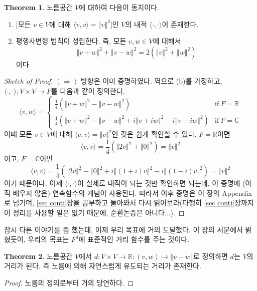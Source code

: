 \documentclass[11pt]{book}
\numberwithin{equation}{chapter}
\def\RR{\mathbb{R}}
\def\CC{\mathbb{C}}
\newcommand{\inner}[2]{\langle#1, #2\rangle}
\newcommand{\norm}[1]{\left\Vert#1\right\Vert}
\def\textif{\text{if}}
\theoremstyle{definition}
\newtheorem{thm}{Theorem}[section]
\begin{document}
\begin{thm} \label{thm 3.3.4}
    노름공간 \(V\)에 대하여 다음이 동치이다.
    \begin{enumerate} [label=(\alph*), leftmargin=2\parindent]
        \item {[모든 \(v \in V\)에 대해 \(\inner{v}{v} = \norm{v}^2\)]}인 \(V\)의 내적 \(\inner{\cdot}{\cdot}\)이 존재한다.
        \item 평행사변형 법칙이 성립한다. 즉, 모든 \(v, w \in V\)에 대해서
        \[
            \norm{v+w}^2 + \norm{v-w}^2 = 2(\norm{v}^2 + \norm{w}^2)    
        \]
        이다.
    \end{enumerate}
\end{thm}
\begin{proof} [Sketch of Proof]
    \((\Rightarrow)\) 방향은 이미 증명하였다. 역으로 (b)를 가정하고, \(\inner{\cdot}{\cdot} : V \times V \to F\)를 다음과 같이 정의한다.
    \[
    \inner{v}{w} =
        \begin{cases}
            \frac{1}{4}(\norm{v+w}^2 - \norm{v-w}^2) &\textif \ F = \RR\\
            \frac{1}{4}(\norm{v+w}^2 - \norm{v-w}^2 + i\norm{v+iw}^2 -i\norm{v-iw}^2) &\textif \ F = \CC
        \end{cases}    
    \]
    이때 모든 \(v \in V\)에 대해 \(\inner{v}{v} = \norm{v}^2\)인 것은 쉽게 확인할 수 있다. \(F = \RR\)이면
    \[
    \inner{v}{v} = \frac{1}{4}(\norm{2v}^2 + \norm{0}^2) = \norm{v}^2  
    \]
    이고, \(F =\CC\)이면
    \[
    \inner{v}{v} = \frac{1}{4}(\norm{2v}^2 - \norm{0}^2 + i\norm{(1+i)v}^2 -i\norm{(1-i)v}^2) = \norm{v}^2    
    \]
    이기 때문이다. 이제 \(\inner{\cdot}{\cdot}\)이 실제로 내적이 되는 것만 확인하면 되는데, 이 증명에 (아직 배우지 않은) 연속함수의 개념이 사용된다. 따라서 이후 증명은 이 장의 Appendix로 넘기며, \ref{sec conti}장을 공부하고 돌아와서 다시 읽어보라(다행히 \ref{sec conti}장까지 이 정리를 사용할 일은 없기 때문에, 순환논증은 아니다\(\ldots\)).
\end{proof}

잠시 다른 이야기를 좀 했는데, 이제 우리 목표에 거의 도달했다. 이 장의 서문에서 밝혔듯이, 우리의 목표는 \(F^d\)에 표준적인 거리 함수를 주는 것이다.

\begin{thm}
    노름공간 \(V\)에서 \(d : V \times V \to \RR : (v, w) \mapsto \norm{v - w}\)로 정의하면 \(d\)는 \(V\)의 거리가 된다. 즉 노름에 의해 자연스럽게 유도되는 거리가 존재한다.
\end{thm}
\begin{proof}
    노름의 정의로부터 거의 당연하다.
\end{proof}
\end{document}
